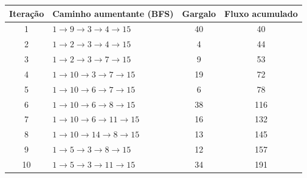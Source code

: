 \begin{footnotesize}
\begin{longtable}{c l c c}
\toprule
Itera\c{c}\~ao & Caminho aumentante (BFS) & Gargalo & Fluxo acumulado \\
\midrule
\endhead
1 & $1 \to  9 \to  3 \to  4 \to  15$ & 40 & 40 \\
2 & $1 \to  2 \to  3 \to  4 \to  15$ & 4 & 44 \\
3 & $1 \to  2 \to  3 \to  7 \to  15$ & 9 & 53 \\
4 & $1 \to  10 \to  3 \to  7 \to  15$ & 19 & 72 \\
5 & $1 \to  10 \to  6 \to  7 \to  15$ & 6 & 78 \\
6 & $1 \to  10 \to  6 \to  8 \to  15$ & 38 & 116 \\
7 & $1 \to  10 \to  6 \to  11 \to  15$ & 16 & 132 \\
8 & $1 \to  10 \to  14 \to  8 \to  15$ & 13 & 145 \\
9 & $1 \to  5 \to  3 \to  8 \to  15$ & 12 & 157 \\
10 & $1 \to  5 \to  3 \to  11 \to  15$ & 34 & 191 \\
\bottomrule
\end{longtable}
\end{footnotesize}
